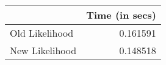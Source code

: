 \begin{tabular}{lr}
\toprule
{} &  Time (in secs) \\
\midrule
Old Likelihood &        0.161591 \\
New Likelihood &        0.148518 \\
\bottomrule
\end{tabular}
